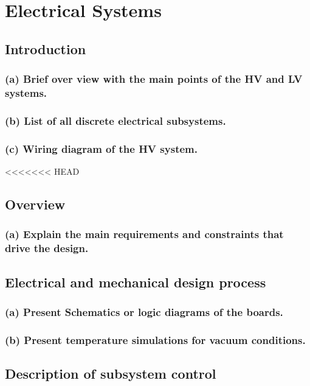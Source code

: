 
\chapter{Electrical Systems}
\section{Introduction}
\subsection{(a) Brief over view with the main points of the HV and LV systems.}
\subsection{(b) List of all discrete electrical subsystems.}
\subsection{(c) Wiring diagram of the HV system.}

<<<<<<< HEAD

\section{Overview}
\subsection{(a) Explain the main requirements and constraints that drive the design.}


\section{Electrical and mechanical design process}
\subsection{(a) Present Schematics or logic diagrams of the boards.}
\subsection{(b) Present temperature simulations for vacuum conditions.}


\section{Description of subsystem control}
